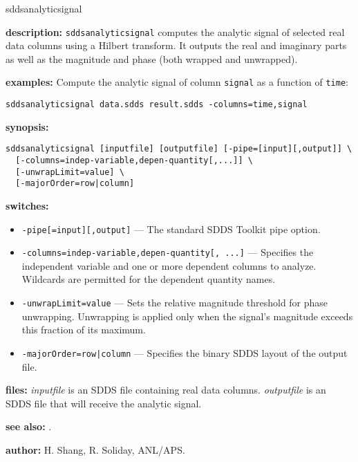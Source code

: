 \begin{sddsprog}{sddsanalyticsignal}
\item \textbf{description:} \verb|sddsanalyticsignal| computes the analytic signal of selected real data columns using a Hilbert transform.  It outputs the real and imaginary parts as well as the magnitude and phase (both wrapped and unwrapped).
\item \textbf{examples:}
  Compute the analytic signal of column \verb|signal| as a function of \verb|time|:
  \begin{verbatim}
sddsanalyticsignal data.sdds result.sdds -columns=time,signal
  \end{verbatim}
\item \textbf{synopsis:}
  \begin{verbatim}
sddsanalyticsignal [inputfile] [outputfile] [-pipe=[input][,output]] \
  [-columns=indep-variable,depen-quantity[,...]] \
  [-unwrapLimit=value] \
  [-majorOrder=row|column]
  \end{verbatim}
\item \textbf{switches:}
  \begin{itemize}
  \item \verb|-pipe[=input][,output]| --- The standard SDDS Toolkit pipe option.
  \item \verb|-columns=indep-variable,depen-quantity[, ...]| --- Specifies the independent variable and one or more dependent columns to analyze.  Wildcards are permitted for the dependent quantity names.
  \item \verb|-unwrapLimit=value| --- Sets the relative magnitude threshold for phase unwrapping.  Unwrapping is applied only when the signal's magnitude exceeds this fraction of its maximum.
  \item \verb!-majorOrder=row|column! --- Specifies the binary SDDS layout of the output file.
  \end{itemize}
\item \textbf{files:} \emph{inputfile} is an SDDS file containing real data columns.  \emph{outputfile} is an SDDS file that will receive the analytic signal.
\item \textbf{see also:} \progref{sddsfft}.
\item \textbf{author:} H. Shang, R. Soliday, ANL/APS.
\end{sddsprog}
